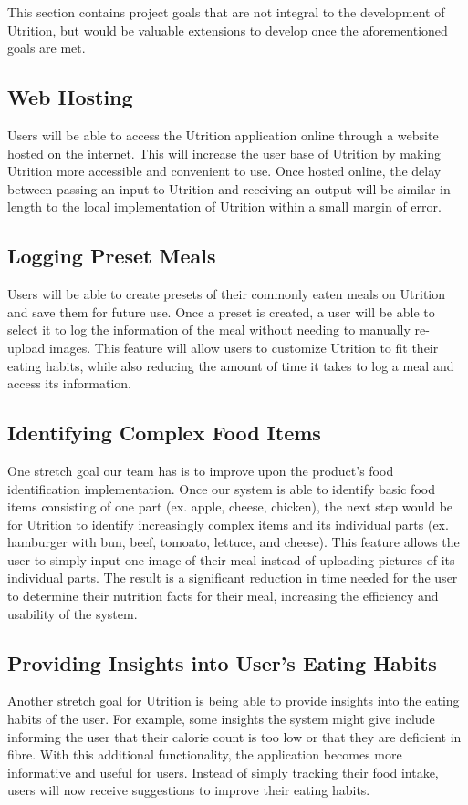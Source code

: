 \documentclass{article}
\begin{document}
This section contains project goals that are not integral to the development of Utrition, but would be valuable extensions to develop once the aforementioned goals are met.

\subsection{Web Hosting}

Users will be able to access the Utrition application online through a website hosted on the internet. This will increase the user base of Utrition by making Utrition more accessible and convenient to use. Once hosted online, the delay between passing an input to Utrition and receiving an output will be similar in length to the local implementation of Utrition within a small margin of error.

\subsection{Logging Preset Meals}

Users will be able to create presets of their commonly eaten meals on Utrition and save them for future use. Once a preset is created, a user will be able to select it to log the information of the meal without needing to manually re-upload images. This feature will allow users to customize Utrition to fit their eating habits, while also reducing the amount of time it takes to log a meal and access its information.

\subsection{Identifying Complex Food Items}

One stretch goal our team has is to improve upon the product's food identification implementation. Once our system is able to identify basic food items consisting of one part (ex. apple, cheese, chicken), the next step would be for Utrition to identify increasingly complex items and its individual parts (ex. hamburger with bun, beef, tomoato, lettuce, and cheese). This feature allows the user to simply input one image of their meal instead of uploading pictures of its individual parts. The result is a significant reduction in time needed for the user to determine their nutrition facts for their meal, increasing the efficiency and usability of the system.

\subsection{Providing Insights into User's Eating Habits}

Another stretch goal for Utrition is being able to provide insights into the eating habits of the user. For example, some insights the system might give include informing the user that their calorie count is too low or that they are deficient in fibre. With this additional functionality, the application becomes more informative and useful for users. Instead of simply tracking their food intake, users will now receive suggestions to improve their eating habits.
\end{document}
